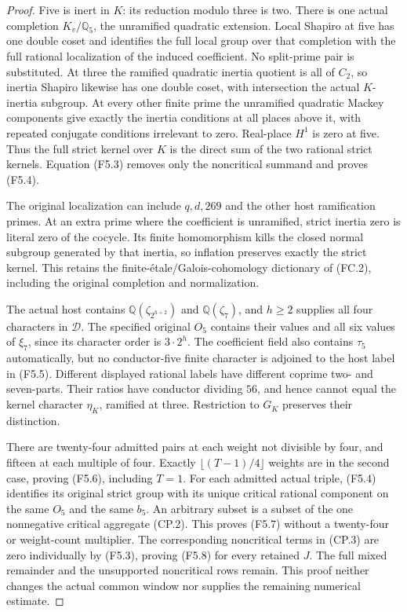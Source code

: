 \begin{proof}
Five is inert in $K$: its reduction modulo three is two.
There is one actual completion $K_v/\mathbb Q_5$, the
unramified quadratic extension. Local Shapiro at five has
one double coset and identifies the full local group over
that completion with the full rational localization of
the induced coefficient. No split-prime pair is substituted.
At three the ramified quadratic inertia quotient is all
of $C_2$, so inertia Shapiro likewise has one double coset,
with intersection the actual $K$-inertia subgroup.
At every other finite prime the unramified quadratic
Mackey components give exactly the inertia conditions at
all places above it, with repeated conjugate conditions
irrelevant to zero. Real-place $H^1$ is zero at five.
Thus the full strict kernel over $K$ is the direct sum
of the two rational strict kernels. Equation (F5.3)
removes only the noncritical summand and proves (F5.4).

The original localization can include $q,d,269$ and the
other host ramification primes. At an extra prime where
the coefficient is unramified, strict inertia zero is
literal zero of the cocycle. Its finite homomorphism
kills the closed normal subgroup generated by that inertia,
so inflation preserves exactly the strict kernel.
This retains the finite-\'etale/Galois-cohomology dictionary
of (FC.2), including the original completion and normalization.

The actual host contains $\mathbb Q(\zeta_{2^{h+2}})$ and
$\mathbb Q(\zeta_7)$, and $h\geq2$ supplies all four
characters in $\mathcal D$.
The specified original $O_5$ contains their values and all
six values of $\xi_7$, since its character order is
$3\cdot2^h$. The coefficient field also contains $\tau_5$
automatically, but no conductor-five finite character is
adjoined to the host label in (F5.5).
Different displayed rational labels have different
coprime two- and seven-parts. Their ratios have conductor
dividing $56$, and hence cannot equal the kernel character
$\eta_K$, ramified at three. Restriction to $G_K$ preserves
their distinction.

There are twenty-four admitted pairs at each weight not
divisible by four, and fifteen at each multiple of four.
Exactly $\lfloor (T-1)/4\rfloor$ weights are in the second
case, proving (F5.6), including $T=1$.
For each admitted actual triple, (F5.4) identifies its
original strict group with its unique critical rational
component on the same $O_5$ and the same $b_5$.
An arbitrary subset is a subset of the one nonnegative
critical aggregate (CP.2). This proves (F5.7) without a
twenty-four or weight-count multiplier.
The corresponding noncritical terms in (CP.3) are zero
individually by (F5.3), proving (F5.8) for every retained $J$.
The full mixed remainder and the unsupported noncritical
rows remain. This proof neither changes the actual common
window nor supplies the remaining numerical estimate.
\end{proof}

